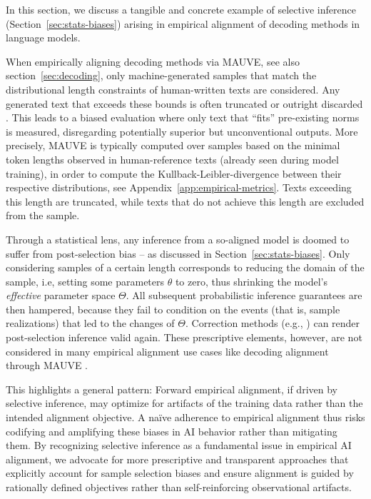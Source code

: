 \documentclass{article}
\theoremstyle{plain}
\theoremstyle{definition}
\theoremstyle{remark}
\begin{document}
In this section, we discuss a tangible and concrete example of selective inference (Section~\ref{sec:stats-biases}) arising in empirical alignment of decoding methods in language models.  

When empirically aligning decoding methods via MAUVE, see also section~\ref{sec:decoding}, only machine-generated samples that match the distributional length constraints of human-written texts are considered. Any generated text that exceeds these bounds is often truncated or outright discarded \cite{pillutla2021mauvemeasuringgapneural,garces-arias-etal-2024-adaptive}. This leads to a biased evaluation where only text that “fits” pre-existing norms is measured, disregarding potentially superior but unconventional outputs. More precisely, MAUVE is typically computed over samples based on the minimal token lengths observed in human-reference texts (already seen during model training), in order to compute the Kullback-Leibler-divergence between their respective distributions, see Appendix~\ref{app:empirical-metrics}. Texts exceeding this length are truncated, while texts that do not achieve this length are excluded from the sample.

Through a statistical lens, any inference from a so-aligned model is doomed to suffer from post-selection bias -- as discussed in Section~\ref{sec:stats-biases}. Only considering samples of a certain length corresponds to reducing the domain of the sample, i.e, setting some parameters $\theta$ to zero, thus shrinking the model's \textit{effective} parameter space $\Theta$. All subsequent probabilistic inference guarantees are then hampered, because they fail to condition on the events (that is, sample realizations) that led to the changes of $\Theta$. 
%
Correction methods (e.g., \citet{berk2013valid,benjamini1995controlling,wasserman2009high,fithian2014optimal,tibshirani2016exact,lee2016exact}) can render post-selection inference valid again. These prescriptive elements, however, are not considered in many empirical alignment use cases like decoding alignment through MAUVE \cite{pillutla2021mauvemeasuringgapneural}.

This highlights a general pattern: Forward empirical alignment, if driven by selective inference, may optimize for artifacts of the training data rather than the intended alignment objective. A naïve adherence to empirical alignment thus risks codifying and amplifying these biases in AI behavior rather than mitigating them.
%
By recognizing selective inference as a fundamental issue in empirical AI alignment, we advocate for more prescriptive and transparent approaches that explicitly account for sample selection biases and ensure alignment is guided by rationally defined objectives rather than self-reinforcing observational artifacts.
\end{document}
